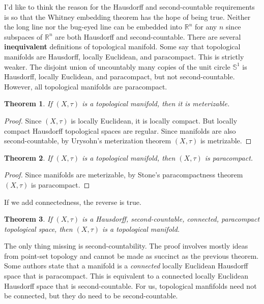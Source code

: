 \documentclass{article}
\theoremstyle{plain}
\newtheorem{theorem}{Theorem}[section]
\theoremstyle{normal}
\begin{document}
        I'd like to think the reason for the Hausdorff and second-countable
        requirements is so that the Whitney embedding theorem has the hope of
        being true. Neither the long line nor the bug-eyed line can be
        embedded into $\mathbb{R}^{n}$ for any $n$ since subspaces of
        $\mathbb{R}^{n}$ are both Hausdorff and second-countable. There are
        several \textbf{inequivalent} definitions of topological manifold. Some
        say that topological manifolds are Hausdorff, locally Euclidean, and
        paracompact. This is strictly weaker. The disjoint union of uncountably
        many copies of the unit circle $\mathbb{S}^{1}$ is Hausdorff, locally
        Euclidean, and paracompact, but not second-countable. However, all
        topological manifolds are paracompact.
        \begin{theorem}
            If $(X,\tau)$ is a topological manifold, then it is meterizable.
        \end{theorem}
        \begin{proof}
            Since $(X,\tau)$ is locally Euclidean, it is locally compact.
            But locally compact Hausdorff topological spaces are regular.
            Since manifolds are also second-countable,
            by Urysohn's meterization theorem $(X,\tau)$ is metrizable.
        \end{proof}
        \begin{theorem}
            If $(X,\tau)$ is a topological manifold, then $(X,\tau)$ is
            paracompact.
        \end{theorem}
        \begin{proof}
            Since manifolds are meterizable,
            by Stone's paracompactness theorem $(X,\tau)$ is paracompact.
        \end{proof}
        If we add connectedness, the reverse is true.
        \begin{theorem}
            If $(X,\tau)$ is a Hausdorff, second-countable, connected,
            paracompact topological space, then $(X,\tau)$ is a topological
            manifold.
        \end{theorem}
        The only thing missing is second-countability. The proof involves mostly
        ideas from point-set topology and cannot be made as succinct as the
        previous theorem. Some authors state that a manifold is a
        \textit{connected} locally Euclidean Hausdorff space that is
        paracompact. This is equivalent to a connected locally Euclidean
        Hausdorff space that is second-countable. For us, topological manfifolds
        need not be connected, but they do need to be second-countable.
\end{document}
